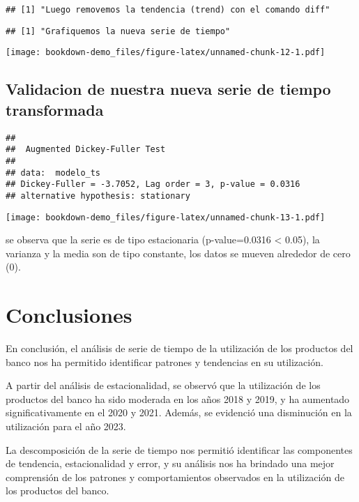 \documentclass[
]{book}
\begin{document}
\begin{verbatim}
## [1] "Luego removemos la tendencia (trend) con el comando diff"
\end{verbatim}

\begin{verbatim}
## [1] "Grafiquemos la nueva serie de tiempo"
\end{verbatim}

\texttt{[image: bookdown-demo\_files/figure-latex/unnamed-chunk-12-1.pdf]}

\hypertarget{validacion-de-nuestra-nueva-serie-de-tiempo-transformada}{%
\subsection{Validacion de nuestra nueva serie de tiempo transformada}\label{validacion-de-nuestra-nueva-serie-de-tiempo-transformada}}

\begin{verbatim}
## 
##  Augmented Dickey-Fuller Test
## 
## data:  modelo_ts
## Dickey-Fuller = -3.7052, Lag order = 3, p-value = 0.0316
## alternative hypothesis: stationary
\end{verbatim}

\texttt{[image: bookdown-demo\_files/figure-latex/unnamed-chunk-13-1.pdf]}

se observa que la serie es de tipo estacionaria (p-value=0.0316 \textless{} 0.05), la varianza y la media son de tipo constante, los datos se mueven alrededor de cero (0).

\hypertarget{conclusiones}{%
\section{Conclusiones}\label{conclusiones}}

En conclusión, el análisis de serie de tiempo de la utilización de los productos del banco nos ha permitido identificar patrones y tendencias en su utilización.

A partir del análisis de estacionalidad, se observó que la utilización de los productos del banco ha sido moderada en los años 2018 y 2019, y ha aumentado significativamente en el 2020 y 2021. Además, se evidenció una disminución en la utilización para el año 2023.

La descomposición de la serie de tiempo nos permitió identificar las componentes de tendencia, estacionalidad y error, y su análisis nos ha brindado una mejor comprensión de los patrones y comportamientos observados en la utilización de los productos del banco.
\end{document}
